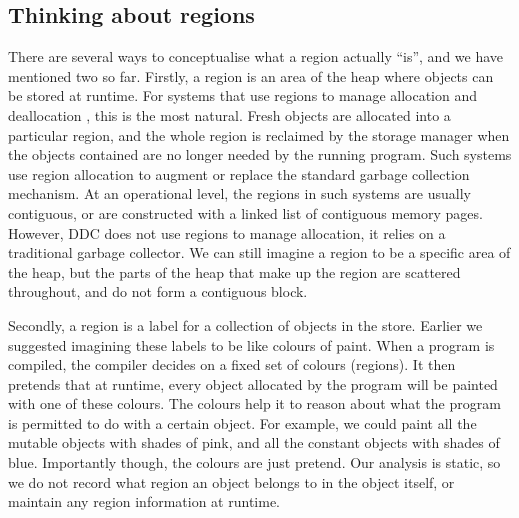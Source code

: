\subsection{Thinking about regions}
There are several ways to conceptualise what a region actually ``is'', and we have mentioned two so far. Firstly, a region is an area of the heap where objects can be stored at runtime. For systems that use regions to manage allocation and deallocation \cite{tofte:mlkit-4.3.0}, this is the most natural. Fresh objects are allocated into a particular region, and the whole region is reclaimed by the storage manager when the objects contained are no longer needed by the running program. Such systems use region allocation to augment or replace the standard garbage collection mechanism. At an operational level, the regions in such systems are usually contiguous, or are constructed with a linked list of contiguous memory pages. However, DDC does not use regions to manage allocation, it relies on a traditional garbage collector. We can still imagine a region to be a specific area of the heap, but the parts of the heap that make up the region are scattered throughout, and do not form a contiguous block.

Secondly, a region is a label for a collection of objects in the store. Earlier we suggested imagining these labels to be like colours of paint. When a program is compiled, the compiler decides on a fixed set of colours (regions). It then pretends that at runtime, every object allocated by the program will be painted with one of these colours. The colours help it to reason about what the program is permitted to do with a certain object. For example, we could paint all the mutable objects with shades of pink, and all the constant objects with shades of blue. Importantly though, the colours are just pretend. Our analysis is static, so we do not record what region an object belongs to in the object itself, or maintain any region information at runtime.

